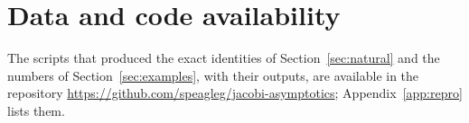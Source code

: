 \documentclass[11pt]{amsart}
\theoremstyle{definition}
\theoremstyle{remark}
\numberwithin{equation}{section}
\numberwithin{table}{section}
\begin{document}
\section*{Data and code availability}
{\raggedright The scripts that produced the exact identities of Section~\ref{sec:natural} and the numbers of
Section~\ref{sec:examples}, with their outputs, are available in the repository
\url{https://github.com/speagleg/jacobi-asymptotics}; Appendix~\ref{app:repro} lists them.
\par}



\end{document}
